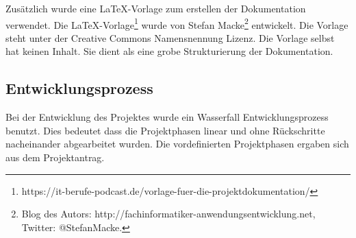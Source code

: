 Zusätzlich wurde eine LaTeX-Vorlage zum erstellen der Dokumentation verwendet.  Die LaTeX-Vorlage\footnote{\Vgl https://it-berufe-podcast.de/vorlage-fuer-die-projektdokumentation/} wurde von Stefan Macke\footnote{\Vgl Blog des Autors: http://fachinformatiker-anwendungsentwicklung.net, Twitter: @StefanMacke.} entwickelt. Die Vorlage steht unter der Creative Commons Namensnennung Lizenz. Die Vorlage selbst hat keinen Inhalt. Sie dient als eine grobe Strukturierung der Dokumentation.

\subsection{Entwicklungsprozess}
\label{sec:Entwicklungsprozess}

Bei der Entwicklung des Projektes wurde ein Wasserfall Entwicklungsprozess benutzt. Dies bedeutet dass die Projektphasen linear und ohne Rückschritte nacheinander abgearbeitet wurden. Die vordefinierten Projektphasen ergaben sich aus dem Projektantrag.

